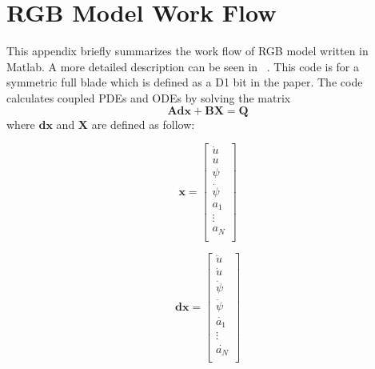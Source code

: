 \chapter{RGB Model Work Flow}
\label{ap:rgbworkflow}
This appendix briefly summarizes the work flow of RGB model written in Matlab. A more detailed description can be seen in ~\cite{ref:zhang2020a}. This code is for a symmetric full blade which is defined as a D1 bit in the paper. The code calculates coupled PDEs and ODEs by solving the matrix
\begin{equation}
	\label{eq:rgbmatrix}
	\bm{Adx} + \bm{BX} = \bm{Q}
\end{equation}
where $\bm{dx}$ and $\bm{X}$ are defined as follow:

\vspace{\abovedisplayskip}
\noindent\begin{minipage}{.4\linewidth}
	\begin{equation}
		\bm{x}=
		\begin{bmatrix}
		\dot{u} \\
		u \\
		\psi \\
		\dot{\psi} \\
		a_1\ \\
		\vdots \\
		a_N \\
		\end{bmatrix}
	\end{equation}
\end{minipage}%
\hfill
\begin{minipage}{.4\linewidth}
	\begin{equation}
		\bm{dx}=
		\begin{bmatrix}
		\ddot{u} \\
		\dot{u} \\
		\dot{\psi} \\
		\ddot{\psi} \\
		\dot{a_1}\ \\
		\vdots \\
		\dot{a_N} \\
		\end{bmatrix}
	\end{equation}
\end{minipage}
\vspace{\belowdisplayskip}

